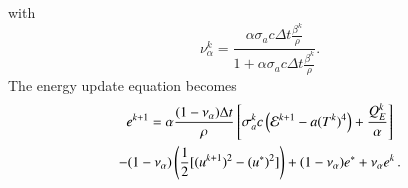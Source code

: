 with 
\begin{equation}
    \nu^k_{\alpha} = \frac{\alpha\sigma_a c\Delta t \frac{\beta^k}{\rho}}{1 +
    \alpha\sigma_a c\Delta t \frac{\beta^k}{\rho}}.
\end{equation}
The energy update equation becomes
\begin{multline}
    e^{k+1} = \alpha\frac{(1-\nu_{\alpha})\Delta t}{\rho}\left[\sigma_a^k c \left(
    \mathcal{E}^{k+1} - a(T^k)^4\right) + \frac{Q_E^k}{\alpha} \right] \\ - (1 -
    \nu_{\alpha})\left(\frac{1}{2}[(u^{k+1})^2 - (u^*)^2]\right)
    +(1-\nu_\alpha)e^*+ \nu_{\alpha}e^k \, .
\end{multline}

